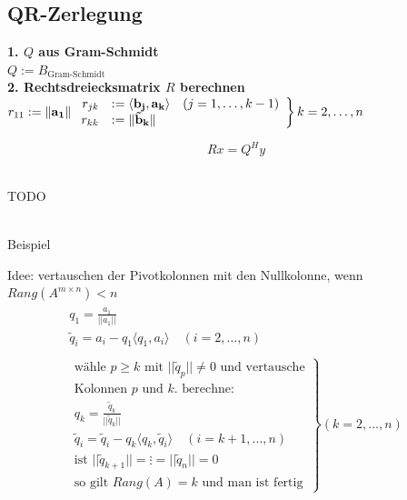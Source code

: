 \documentclass[a4paper,twocolumn]{article}
\begin{document}
	\subsection{QR-Zerlegung}
		\begin{falgo}[QR-Zerlegung]
			\textbf{1. $Q$ aus Gram-Schmidt}\\
				$Q := B_{\text{Gram-Schmidt}}$\\[1mm]
			\textbf{2. Rechtsdreiecksmatrix $R$ berechnen}\\
				$
				r_{11} := \|\mathbf{a_{1}}\| \\
				\left.
					\begin{array}{rl}
						r_{jk} &:= \langle \mathbf{b_j},\mathbf{a_k} \rangle \quad (j = 1, \ldots, k-1) \\
						r_{kk} &:= \|\mathbf{\tilde b_k}\|
					\end{array} 
				\right\} k = 2, \ldots, n
				$     
		\end{falgo}
	
	\begin{fmerke}
		$$Rx = Q^Hy$$\\[-10mm]
	\end{fmerke}
	\begin{Huge}TODO\end{Huge}\\ Beispiel
	\begin{falgo}
		Idee: vertauschen der Pivotkolonnen mit den Nullkolonne, wenn $Rang(A^{m \times n}) < n$\\
		\begin{align*}
			\begin{array}{l}
			q_1 = \frac{a_1}{||a_1||}	\\
			\tilde q_i = a_i - q_1 \langle q_1, a_i \rangle \quad (i = 2, \hdots , n)\\ \\
			\left.
				\begin{array}{l}
				\text{wähle $p \geq k$ mit $|| \tilde q_p || \neq 0$ und vertausche}\\
				\text{Kolonnen $p$ und $k$. berechne:}\\
					q_k = \frac{\tilde q_k}{|| \tilde q_k ||}\\
					\tilde q_i = \tilde q_i - q_k \langle q_k, \tilde q_i \rangle \quad (i = k+1,...,n) \\
					\text{ist } ||\tilde q_{k+1} || = \vdots = ||\tilde q_n|| = 0\\
					\text{so gilt $Rang(A) = k$ und man ist fertig}
				\end{array} \right\rbrace (k = 2,...,n)
			\end{array}
		\end{align*}

	\end{falgo}
\end{document}
